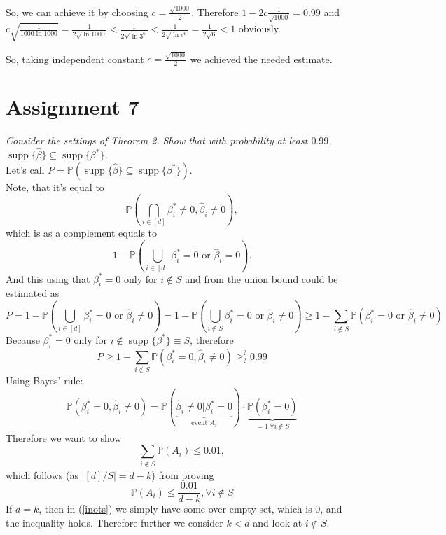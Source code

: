 \documentclass[]{article}
\DeclareMathOperator\supp{supp}
\begin{document}
So, we can achieve it by choosing $c = \frac{\sqrt{1000}}{2}$. Therefore $1-2c\frac{1}{\sqrt{1000}}=0.99$ and $c\sqrt{\frac{1}{1000\ln{1000}}}=\frac{1}{2\sqrt{\ln 1000}} < \frac{1}{2\sqrt{\ln{3^6}}} < \frac{1}{2\sqrt{\ln{e^6}}} = \frac{1}{2\sqrt{6}} < 1$ obviously.

So, taking independent constant $c=\frac{\sqrt{1000}}{2}$ we achieved the needed estimate.
\section*{Assignment 7}
\textit{Consider the settings of Theorem 2. Show that with probability at least $0.99$, $\supp\{\hat{\beta}\}\subseteq\supp\{\beta^*\}$.}\\
Let's call $P=\mathbb{P}(\supp\{\hat{\beta}\}\subseteq\supp\{\beta^*\})$.\\
Note, that it's equal to $$\mathbb{P}\left(\bigcap_{i\in[d]}\text{}\beta_i^* \ne 0, \hat{\beta}_i \ne 0\right),$$ 
which is as a complement equals to
$$1 - \mathbb{P}\left(\bigcup_{i\in[d]}\beta_i^* = 0 \text{ or } \hat{\beta}_i = 0\right).$$
And this using that $\beta_i^*=0$ only for $i\notin S$ and from the union bound could be estimated as
\begin{equation}
P = 1 - \mathbb{P}\left(\bigcup_{i\in[d]}\beta_i^* = 0 \text{ or } \hat{\beta}_i \ne 0\right)
=   1 - \mathbb{P}\left(\bigcup_{i\notin S}\beta_i^* = 0 \text{ or } \hat{\beta}_i \ne 0\right)
\ge 1 - \sum_{i\notin S} \mathbb{P}\left(\beta_i^* = 0 \text{ or } \hat{\beta}_i \ne 0\right)
\end{equation}
Because $\beta_i^*=0$ only for $i\notin\supp\{\beta^*\} \equiv S$, therefore
\begin{equation}
P \ge 1 - \sum_{i\notin S}\mathbb{P}\left(\beta_i^* = 0, \hat{\beta}_i \ne 0\right) \ge_?^? 0.99
\label{end}
\end{equation}
Using Bayes' rule:
\begin{equation}
\mathbb{P}\left(\beta_i^* = 0, \hat{\beta}_i \ne 0\right)
=
\mathbb{P}\left(\underbrace{\hat{\beta}_i \ne 0\bigg\vert\beta_i^* = 0}_{\text{event } A_i}\right)
\cdot
\underbrace{\mathbb{P}\left(\beta_i^* = 0\right)}_{=1 \:\forall i\notin S}
\end{equation}
Therefore we want to show
\begin{equation}
\sum_{i\notin S}\mathbb{P}\left(A_i\right) \le 0.01,
\label{inots}
\end{equation}
which follows (as $|[d]/S|=d-k$) from proving
\begin{equation}
\mathbb{P}\left(A_i\right) \le \frac{0.01}{d-k}, \forall i\notin S
\label{pa}
\end{equation}
If $d=k$, then in (\ref{inots}) we simply have some over empty set, which is 0, and the inequality holds. Therefore further we consider $k<d$ and look at $i\notin S$.\\
\end{document}
